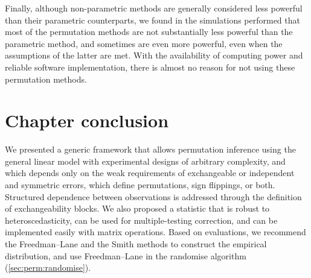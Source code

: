 Finally, although non-parametric methods are generally considered less powerful than their parametric counterparts, we found in the simulations performed that most of the permutation methods are not substantially less powerful than the parametric method, and sometimes are even more powerful, even when the assumptions of the latter are met. With the availability of computing power and reliable software implementation, there is almost no reason for not using these permutation methods.

\section{Chapter conclusion}

We presented a generic framework that allows permutation inference using the general linear model with experimental designs of arbitrary complexity, and which depends only on the weak requirements of exchangeable or independent and symmetric errors, which define permutations, sign flippings, or both. Structured dependence between observations is addressed through the definition of exchangeability blocks. We also proposed a statistic that is robust to heteroscedasticity, can be used for multiple-testing correction, and can be implemented easily with matrix operations. Based on evaluations, we recommend the Freedman--Lane and the Smith methods to construct the empirical distribution, and use Freedman--Lane in the randomise algorithm (\ref{sec:perm:randomise}).
